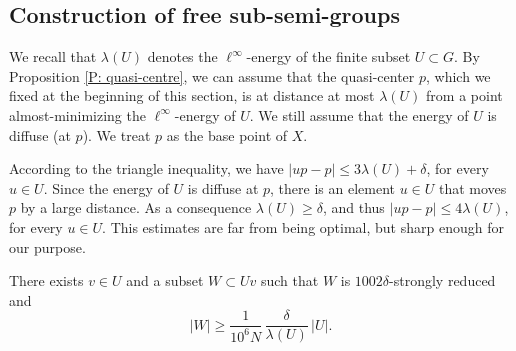 \subsection{Construction of free sub-semi-groups}

We recall that $\lambda(U)$ denotes the $\ell^\infty$\nobreakdash-energy of the finite subset $U \subset G$.
By Proposition \ref{P: quasi-centre}, we can assume that the quasi-center $p$, which we fixed at the beginning of this section, is at distance at most $\lambda (U)$ from a point almost-minimizing the $\ell^\infty$-energy of $U$.
We still assume that the energy of $U$ is diffuse (at $p$).
We treat $p$ as the base point of $X$.

\begin{rem}
According to the triangle inequality, we have $|up - p| \leq 3\lambda(U) + \delta$, for every $u \in U$.
Since the energy of $U$ is diffuse at $p$, there is an element $u \in U$ that moves $p$ by a large distance.
As a consequence $\lambda(U) \geq \delta$, and thus $|up - p| \leq 4\lambda(U)$, for every $u \in U$.
This estimates are far from being optimal, but sharp enough for our purpose.
\end{rem}

\begin{prop}
\label{P: construction semi-group}
There exists $v \in U$ and a subset $W \subset Uv$ such that $W$ is $1002\delta$-strongly reduced and
\begin{equation*}
|W| \geq \frac 1{10^6N}\,\frac \delta{\lambda(U)}\, |U|.
\end{equation*}
\end{prop}

